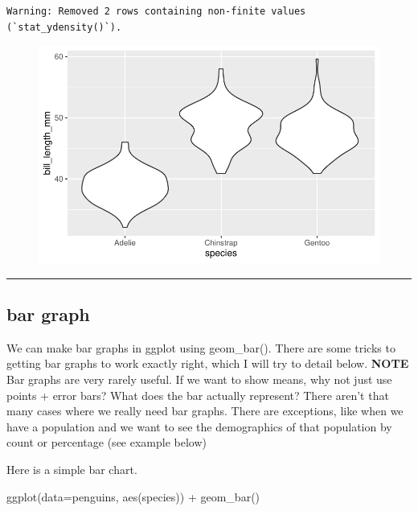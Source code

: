 \documentclass[
  letterpaper,
  DIV=11,
  numbers=noendperiod]{scrartcl}
\newenvironment{Shaded}{\begin{snugshade}}{\end{snugshade}}
\newcommand{\AttributeTok}[1]{\textcolor[rgb]{0.40,0.45,0.13}{#1}}
\newcommand{\FunctionTok}[1]{\textcolor[rgb]{0.28,0.35,0.67}{#1}}
\newcommand{\NormalTok}[1]{\textcolor[rgb]{0.00,0.23,0.31}{#1}}
\newcommand{\SpecialCharTok}[1]{\textcolor[rgb]{0.37,0.37,0.37}{#1}}
\begin{document}
\begin{verbatim}
Warning: Removed 2 rows containing non-finite values (`stat_ydensity()`).
\end{verbatim}

\begin{figure}[H]

{\centering \includegraphics{basic_graphs_files/figure-pdf/unnamed-chunk-9-1.pdf}

}

\end{figure}

\begin{center}\rule{0.5\linewidth}{0.5pt}\end{center}

\subsection{\texorpdfstring{\textbf{bar graph}}{bar graph}}

We can make bar graphs in ggplot using geom\_bar(). There are some
tricks to getting bar graphs to work exactly right, which I will try to
detail below. \textbf{NOTE} Bar graphs are very rarely useful. If we
want to show means, why not just use points + error bars? What does the
bar actually represent? There aren't that many cases where we really
need bar graphs. There are exceptions, like when we have a population
and we want to see the demographics of that population by count or
percentage (see example below)

Here is a simple bar chart.

\begin{Shaded}
\begin{Highlighting}[]
\FunctionTok{ggplot}\NormalTok{(}\AttributeTok{data=}\NormalTok{penguins, }\FunctionTok{aes}\NormalTok{(species)) }\SpecialCharTok{+}
  \FunctionTok{geom\_bar}\NormalTok{()}
\end{Highlighting}
\end{Shaded}
\end{document}
